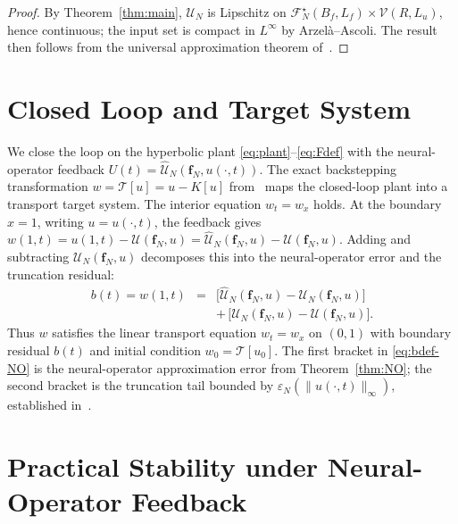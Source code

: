 \documentclass[twocolumn,amsthm]{autart}
\newcommand{\Linf}{L^\infty}
\newcommand{\eps}{\varepsilon}
\theoremstyle{plain}
\theoremstyle{definition}
\begin{document}
\begin{proof}
By Theorem~\ref{thm:main}, $\mathcal{U}_N$ is Lipschitz on $\mathcal{F}_N^\star(B_f,L_f)\times\mathcal{V}(R,L_u)$, hence continuous; the input set is compact in $\Linf$ by Arzel\`a--Ascoli. The result then follows from the universal approximation theorem of~\cite{Lu2021Universal}.
\end{proof}

\section{Closed Loop and Target System}
\label{sec:closedloop}

We close the loop on the hyperbolic plant \eqref{eq:plant}--\eqref{eq:Fdef} with the neural-operator feedback $U(t) = \widehat{\mathcal{U}}_N(\mathbf{f}_N, u(\cdot, t))$. The exact backstepping transformation $w = \mathcal{T}[u] = u - K[u]$ from~\cite{krstic2026feedbacklinearizationhyperbolicpdes} maps the closed-loop plant into a transport target system. The interior equation $w_t = w_x$
holds. At the boundary $x = 1$, writing $u = u(\cdot,t)$, the feedback gives $w(1,t) = u(1,t) - \mathcal{U}(\mathbf{f}_N, u) = \widehat{\mathcal{U}}_N(\mathbf{f}_N, u) - \mathcal{U}(\mathbf{f}_N, u)$. Adding and subtracting $\mathcal{U}_N(\mathbf{f}_N, u)$ decomposes this into the neural-operator error and the truncation residual:
\begin{eqnarray}
b(t) = w(1,t) &=& \bigl[\widehat{\mathcal{U}}_N(\mathbf{f}_N, u) - \mathcal{U}_N(\mathbf{f}_N, u)\bigr] \nonumber \\
&& +\, \bigl[\mathcal{U}_N(\mathbf{f}_N, u) - \mathcal{U}(\mathbf{f}_N, u)\bigr].
\label{eq:bdef-NO}
\end{eqnarray}
Thus $w$ satisfies the linear transport equation $w_t = w_x$ on $(0,1)$ with boundary residual $b(t)$ and initial condition $w_0 = \mathcal{T}[u_0]$. The first bracket in \eqref{eq:bdef-NO} is the neural-operator approximation error from Theorem~\ref{thm:NO}; the second bracket is the truncation tail bounded by $\eps_N(\|u(\cdot,t)\|_\infty)$, established in~\cite{krstic2026feedbacklinearizationhyperbolicpdes-trunc}.

\section{Practical Stability under Neural-Operator Feedback}
\label{sec:stability}
\end{document}
